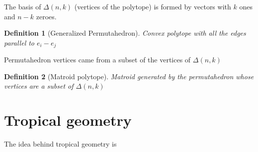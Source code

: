 \documentclass{myclass}
\newtheorem*{definition}{Definition}
\begin{document}
The basis of $\Delta(n,k)$ (vertices of the polytope) is formed by vectors with $k$ ones and  $n-k$ zeroes.

\begin{definition}[Generalized Permutahedron] Convex polytope with all the edges parallel to $e_i-e_j$
\end{definition}

Permutahedron vertices came from a subset of the vertices of $\Delta(n, k)$

 \begin{definition}[Matroid polytope] Matroid generated by the permutahedron whose vertices are a subset of $\Delta(n,k)$



\end{definition}





\section{Tropical geometry}
The idea behind tropical geometry is 
\end{document}
